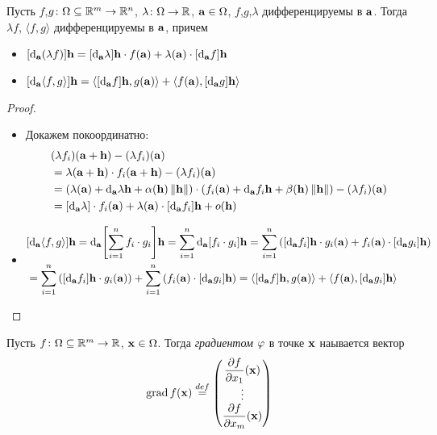\begin{theorem}

    Пусть $f$,$g \colon \Omega \subseteq \mathbb{R}^m \to \mathbb{R}^n$, $\lambda \colon \Omega \to
    \mathbb{R}$, $\mathbf{a} \in \Omega$, $f$,$g$,$\lambda$ дифференцируемы в $\mathbf{a}$. Тогда
    $\lambda f$, $\langle f, g \rangle$ дифференцируемы в $\mathbf{a}$, причем
    \begin{itemize}
        \item $[\mathrm{d}_{\mathbf{a}}{(\lambda f)}]\mathbf{h} =
        [\mathrm{d}_{\mathbf{a}}{\lambda}]\mathbf{h} \cdot f(\mathbf{a}) + \lambda(\mathbf{a}) \cdot
        [\mathrm{d}_{\mathbf{a}}{f}]\mathbf{h}$
        \item $[\mathrm{d}_{\mathbf{a}}{\langle f, g \rangle}]\mathbf{h} =
        \langle [\mathrm{d}_{\mathbf{a}}{f}]\mathbf{h}, g(\mathbf{a}) \rangle
        + \langle f(\mathbf{a}), [\mathrm{d}_{\mathbf{a}}{g}]\mathbf{h} \rangle$

    \end{itemize}
\end{theorem}
\begin{proof}
    \enewline
    \begin{itemize}
        \item Докажем покоординатно:
\begin{align*}
    & (\lambda f_i)(\mathbf{a} + \mathbf{h}) - (\lambda f_i)(\mathbf{a}) \\
    &= \lambda(\mathbf{a} + \mathbf{h}) \cdot f_i(\mathbf{a} + \mathbf{h}) - (\lambda f_i)(\mathbf{a}) \\
    &= (\lambda(\mathbf{a}) + \mathrm{d}_{\mathbf{a}}{\lambda}\mathbf{h} + \alpha(\mathbf{h})\left\lVert\mathbf{h}\right\rVert) \cdot
    (f_i(\mathbf{a}) + \mathrm{d}_{\mathbf{a}}{f_i}\mathbf{h} + \beta(\mathbf{h})\left\lVert\mathbf{h}\right\rVert) - (\lambda f_i)(\mathbf{a}) \\
    &= [\mathrm{d}_{\mathbf{a}}{\lambda}] \cdot f_i(\mathbf{a}) + \lambda(\mathbf{a}) \cdot
    [\mathrm{d}_{\mathbf{a}}{f_i}]\mathbf{h} + o(\mathbf{h})
\end{align*}
        \item
\begin{align*}
    & [\mathrm{d}_{\mathbf{a}}{\langle f, g \rangle}]\mathbf{h} = \mathrm{d}_{\mathbf{a}}{\left[\sum_{i =
    1}^n{f_i \cdot g_i}\right]}\mathbf{h} = \sum_{i =
    1}^n{\mathrm{d}_{\mathbf{a}}{\left[{f_i \cdot g_i}\right]}}\mathbf{h} =
    \sum_{i = 1}^{n}{\left([\mathrm{d}_{\mathbf{a}}{f_i}]\mathbf{h} \cdot g_i(\mathbf{a}) + f_i(\mathbf{a}) \cdot
    [\mathrm{d}_{\mathbf{a}}{g_i}]\mathbf{h}\right)} \\
    &= \sum_{i = 1}^{n}{\left([\mathrm{d}_{\mathbf{a}}{f_i}]\mathbf{h} \cdot g_i(\mathbf{a})\right)} +
    \sum_{i = 1}^{n}{\left(f_i(\mathbf{a}) \cdot [\mathrm{d}_{\mathbf{a}}{g_i}]\mathbf{h}\right)} =
    \langle [\mathrm{d}_{\mathbf{a}}{f}]\mathbf{h}, g(\mathbf{a}) \rangle + \langle f(\mathbf{a}),
    [\mathrm{d}_{\mathbf{a}}{g_i}]\mathbf{h} \rangle
\end{align*}
    \end{itemize}
\end{proof}

\begin{definition}
    Пусть $f \colon \Omega \subseteq \mathbb{R}^m \to \mathbb{R}$, $\mathbf{x} \in \Omega$. Тогда
    \textit{градиентом} $\varphi$ в точке $\mathbf{x}$ наывается вектор
\[
    \operatorname{grad}f(\mathbf{x}) \overset{def}{\underset{}{=}} \begin{pmatrix}
        \dfrac{\partial f}{\partial x_1}(\mathbf{x}) \\
        \vdots \\
        \dfrac{\partial f}{\partial x_m}(\mathbf{x})
    \end{pmatrix}
\]
\end{definition}

